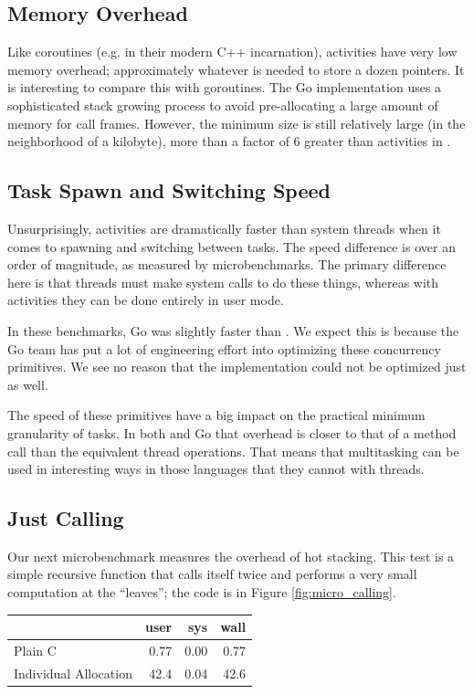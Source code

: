 \documentclass[acmsmall,anonymous,review]{acmart}\settopmatter{printfolios=true,printccs=false,printacmref=false}
\begin{document}
\subsection{Memory Overhead}

Like coroutines (e.g. in their modern C++ incarnation), activities have very low memory overhead; approximately whatever is needed to store a dozen pointers.
It is interesting to compare this with goroutines.
The Go implementation uses a sophisticated stack growing process to avoid pre-allocating a large amount of memory for call frames.
However, the minimum size is still relatively large (in the neighborhood of a kilobyte), more than a factor of 6 greater than activities in \charcoal{}.

\subsection{Task Spawn and Switching Speed}

Unsurprisingly, activities are dramatically faster than system threads when it comes to spawning and switching between tasks.
The speed difference is over an order of magnitude, as measured by microbenchmarks.
The primary difference here is that threads must make system calls to do these things, whereas with activities they can be done entirely in user mode.

In these benchmarks, Go was slightly faster than \charcoal{}.
We expect this is because the Go team has put a lot of engineering effort into optimizing these concurrency primitives.
We see no reason that the \charcoal{} implementation could not be optimized just as well.

The speed of these primitives have a big impact on the practical minimum granularity of tasks.
In both \charcoal{} and Go that overhead is closer to that of a method call than the equivalent thread operations.
That means that multitasking can be used in interesting ways in those languages that they cannot with threads.

\subsection{Just Calling}

Our next microbenchmark measures the overhead of hot stacking.
This test is a simple recursive function that calls itself twice and performs a very small computation at the ``leaves''; the code is in Figure \ref{fig:micro_calling}.

\vspace{1em}
\begin{tabular}{|l|r|r|r|}
  \hline
   & user & sys & wall \\
  \hline
  \hline
  Plain C & 0.77 & 0.00 & 0.77 \\
  \hline
  Individual Allocation & 42.4 & 0.04 & 42.6 \\
  \hline
\end{tabular}
\vspace{1em}
\end{document}
